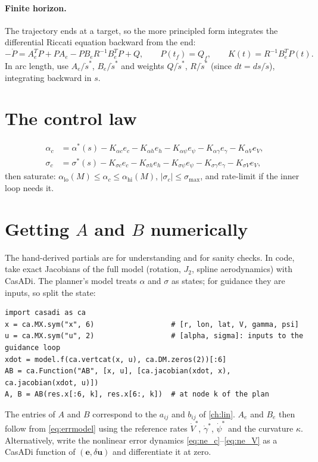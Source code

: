 \documentclass[11pt]{report}
\numberwithin{equation}{chapter}
\newcommand{\vb}[1]{\bm{#1}}
\newcommand{\sdot}{\dot s}
\begin{document}
\paragraph{Finite horizon.} The trajectory ends at a target, so the more principled form
integrates the differential Riccati equation backward from the end:
\begin{equation}
  -\dot P = A_e^T P + P A_e - P B_e R^{-1} B_e^T P + Q,\qquad P(t_f) = Q_f,\qquad
  K(t) = R^{-1}B_e^T P(t).
\end{equation}
In arc length, use $A_e/\sdot^*$, $B_e/\sdot^*$ and weights $Q/\sdot^*$, $R/\sdot^*$
(since $dt = ds/\sdot$), integrating backward in $s$.

\section{The control law}

\begin{align}
  \alpha_c &= \alpha^*(s) - K_{\alpha c}e_c - K_{\alpha h}e_h - K_{\alpha\psi}e_\psi - K_{\alpha\gamma}e_\gamma - K_{\alpha V}e_V, \\
  \sigma_c &= \sigma^*(s) - K_{\sigma c}e_c - K_{\sigma h}e_h - K_{\sigma\psi}e_\psi - K_{\sigma\gamma}e_\gamma - K_{\sigma V}e_V,
\end{align}
then saturate: $\alpha_{\text{lo}}(M)\le\alpha_c\le\alpha_{\text{hi}}(M)$, $|\sigma_c|\le\sigma_{\max}$,
and rate-limit if the inner loop needs it.

\section{Getting $A$ and $B$ numerically}\label{sec:casadi}

The hand-derived partials are for understanding and for sanity checks. In code, take exact
Jacobians of the full model (rotation, $J_2$, spline aerodynamics) with CasADi. The planner's
model treats $\alpha$ and $\sigma$ as states; for guidance they are inputs, so split the state:
\begin{lstlisting}
import casadi as ca
x = ca.MX.sym("x", 6)                  # [r, lon, lat, V, gamma, psi]
u = ca.MX.sym("u", 2)                  # [alpha, sigma]: inputs to the guidance loop
xdot = model.f(ca.vertcat(x, u), ca.DM.zeros(2))[:6]
AB = ca.Function("AB", [x, u], [ca.jacobian(xdot, x), ca.jacobian(xdot, u)])
A, B = AB(res.x[:6, k], res.x[6:, k])  # at node k of the plan
\end{lstlisting}
The entries of $A$ and $B$ correspond to the $a_{ij}$ and $b_{ij}$ of \cref{ch:lin}. $A_e$ and
$B_e$ then follow from \cref{eq:errmodel} using the reference rates $\dot V^*$, $\dot\gamma^*$,
$\dot\psi^*$ and the curvature $\kappa$. Alternatively, write the nonlinear error dynamics
\cref{eq:ne_c}--\cref{eq:ne_V} as a CasADi function of $(\vb e,\delta\vb u)$ and differentiate it
at zero.
\end{document}
